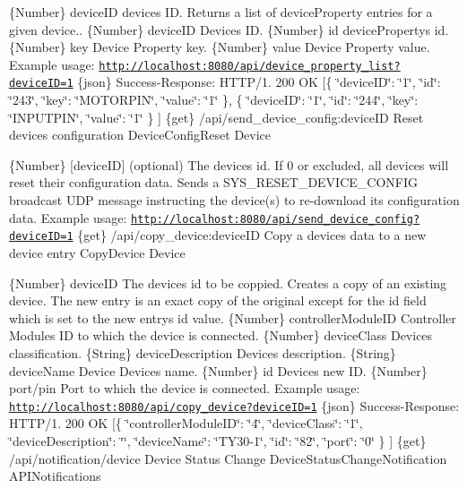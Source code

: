 \{Number\} device\+ID device\textquotesingle{}s ID.  Returns a list of device\+Property entries for a given device..  \{Number\} device\+ID Device\textquotesingle{}s ID.  \{Number\} id device\+Property\textquotesingle{}s id.  \{Number\} key Device Property key.  \{Number\} value Device Property value.  Example usage\+: \href{http://localhost:8080/api/device_property_list?deviceID=1}{\tt http\+://localhost\+:8080/api/device\+\_\+property\+\_\+list?device\+I\+D=1}  \{json\} Success-\/\+Response\+: H\+T\+T\+P/1. 200 OK \mbox{[}\{ \char`\"{}device\+I\+D\char`\"{}\+: \char`\"{}1\char`\"{}, \char`\"{}id\char`\"{}\+: \char`\"{}243\char`\"{}, \char`\"{}key\char`\"{}\+: \char`\"{}\+M\+O\+T\+O\+R\+P\+I\+N\char`\"{}, \char`\"{}value\char`\"{}\+: \char`\"{}1\char`\"{} \}, \{ \char`\"{}device\+I\+D\char`\"{}\+: \char`\"{}1\char`\"{}, \char`\"{}id\char`\"{}\+: \char`\"{}244\char`\"{}, \char`\"{}key\char`\"{}\+: \char`\"{}\+I\+N\+P\+U\+T\+P\+I\+N\char`\"{}, \char`\"{}value\char`\"{}\+: \char`\"{}1\char`\"{} \} \mbox{]}  \{get\} /api/send\+\_\+device\+\_\+config\+:device\+ID Reset device\textquotesingle{}s configuration  Device\+Config\+Reset  Device

\{Number\} \mbox{[}device\+ID\mbox{]} (optional) The device\textquotesingle{}s id. If 0 or excluded, all devices will reset their configuration data.  Sends a S\+Y\+S\+\_\+\+R\+E\+S\+E\+T\+\_\+\+D\+E\+V\+I\+C\+E\+\_\+\+C\+O\+N\+F\+IG broadcast U\+DP message instructing the device(s) to re-\/download its configuration data.  Example usage\+: \href{http://localhost:8080/api/send_device_config?deviceID=1}{\tt http\+://localhost\+:8080/api/send\+\_\+device\+\_\+config?device\+I\+D=1}  \{get\} /api/copy\+\_\+device\+:device\+ID Copy a device\textquotesingle{}s data to a new device entry  Copy\+Device  Device

\{Number\} device\+ID The device\textquotesingle{}s id to be coppied.  Creates a copy of an existing device. The new entry is an exact copy of the original except for the id field which is set to the new entry\textquotesingle{}s id value.  \{Number\} controller\+Module\+ID Controller Module\textquotesingle{}s ID to which the device is connected.  \{Number\} device\+Class Device\textquotesingle{}s classification.  \{String\} device\+Description Device\textquotesingle{}s description.  \{String\} device\+Name Device Device\textquotesingle{}s name.  \{Number\} id Device\textquotesingle{}s new ID.  \{Number\} port/pin Port to which the device is connected.  Example usage\+: \href{http://localhost:8080/api/copy_device?deviceID=1}{\tt http\+://localhost\+:8080/api/copy\+\_\+device?device\+I\+D=1}  \{json\} Success-\/\+Response\+: H\+T\+T\+P/1. 200 OK \mbox{[}\{ \char`\"{}controller\+Module\+I\+D\char`\"{}\+: \char`\"{}4\char`\"{}, \char`\"{}device\+Class\char`\"{}\+: \char`\"{}1\char`\"{}, \char`\"{}device\+Description\char`\"{}\+: \char`\"{}\char`\"{}, \char`\"{}device\+Name\char`\"{}\+: \char`\"{}\+T\+Y30-\/1\char`\"{}, \char`\"{}id\char`\"{}\+: \char`\"{}82\char`\"{}, \char`\"{}port\char`\"{}\+: \char`\"{}0\char`\"{} \} \mbox{]}  \{get\} /api/notification/device Device Status Change  Device\+Status\+Change\+Notification  A\+P\+I\+Notifications

